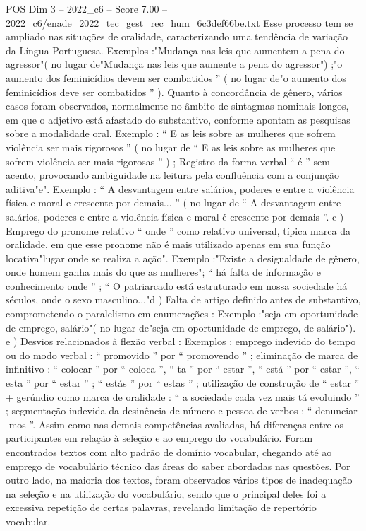 \begin{textsample}{POS Dim 3 – 2022\_c6 – Score 7.00 – 2022\_c6/enade\_2022\_tec\_gest\_rec\_hum\_6c3def66be.txt}
Esse processo tem se ampliado nas situações de oralidade, caracterizando uma tendência de variação da Língua Portuguesa.
Exemplos :"Mudança nas leis que aumentem a pena do agressor"( no lugar de"Mudança nas leis que aumente a pena do agressor") ;"o aumento dos feminicídios devem ser combatidos ” ( no lugar de"o aumento dos feminicídios deve ser combatidos ” ).
Quanto à concordância de gênero, vários casos foram observados, normalmente no âmbito de sintagmas nominais longos, em que o adjetivo está afastado do substantivo, conforme apontam as pesquisas sobre a modalidade oral.
Exemplo : “ E as leis sobre as mulheres que sofrem violência ser mais rigorosos ” ( no lugar de “ E as leis sobre as mulheres que sofrem violência ser mais rigorosas ” ) ; Registro da forma verbal “ é ” sem acento, provocando ambiguidade na leitura pela confluência com a conjunção aditiva"e".
Exemplo : “ A desvantagem entre salários, poderes e entre a violência física e moral e crescente por demais... ” ( no lugar de “ A desvantagem entre salários, poderes e entre a violência física e moral é crescente por demais ”. c ) Emprego do pronome relativo “ onde ” como relativo universal, típica marca da oralidade, em que esse pronome não é mais utilizado apenas em sua função locativa"lugar onde se realiza a ação".
Exemplo :"Existe a desigualdade de gênero, onde homem ganha mais do que as mulheres"; “ há falta de informação e conhecimento onde ” ; “ O patriarcado está estruturado em nossa sociedade há séculos, onde o sexo masculino..."d ) Falta de artigo definido antes de substantivo, comprometendo o paralelismo em enumerações : Exemplo :"seja em oportunidade de emprego, salário"( no lugar de"seja em oportunidade de emprego, de salário"). e ) Desvios relacionados à flexão verbal : Exemplos : emprego indevido do tempo ou do modo verbal : “ promovido ” por “ promovendo ” ; eliminação de marca de infinitivo : “ colocar ” por “ coloca ”, “ ta ” por “ estar ”, “ está ” por “ estar ”, “ esta ” por “ estar ” ; “ estás ” por “ estas ” ; utilização de construção de “ estar ” + gerúndio como marca de oralidade : “ a sociedade cada vez mais tá evoluindo ” ; segmentação indevida da desinência de número e pessoa de verbos : “ denunciar -mos ”.
Assim como nas demais competências avaliadas, há diferenças entre os participantes em relação à seleção e ao emprego do vocabulário.
Foram encontrados textos com alto padrão de domínio vocabular, chegando até ao emprego de vocabulário técnico das áreas do saber abordadas nas questões.
Por outro lado, na maioria dos textos, foram observados vários tipos de inadequação na seleção e na utilização do vocabulário, sendo que o principal deles foi a excessiva repetição de certas palavras, revelando limitação de repertório vocabular.

\end{textsample}
